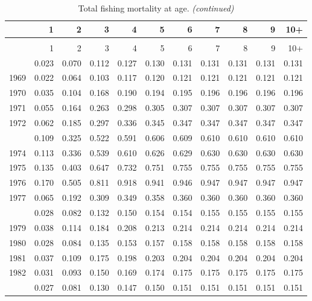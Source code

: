 \documentclass[
]{article}
\begin{document}
\begin{longtable}[t]{lrrrrrrrrrr}
\caption{\label{tab:FAA-tot-table}Total fishing mortality at age.}\\
\toprule
  & 1 & 2 & 3 & 4 & 5 & 6 & 7 & 8 & 9 & 10+\\
\midrule
\endfirsthead
\caption[]{Total fishing mortality at age. \textit{(continued)}}\\
\toprule
  & 1 & 2 & 3 & 4 & 5 & 6 & 7 & 8 & 9 & 10+\\
\midrule
\endhead

\endfoot
\bottomrule
\endlastfoot
1968 & 0.023 & 0.070 & 0.112 & 0.127 & 0.130 & 0.131 & 0.131 & 0.131 & 0.131 & 0.131\\
1969 & 0.022 & 0.064 & 0.103 & 0.117 & 0.120 & 0.121 & 0.121 & 0.121 & 0.121 & 0.121\\
1970 & 0.035 & 0.104 & 0.168 & 0.190 & 0.194 & 0.195 & 0.196 & 0.196 & 0.196 & 0.196\\
1971 & 0.055 & 0.164 & 0.263 & 0.298 & 0.305 & 0.307 & 0.307 & 0.307 & 0.307 & 0.307\\
1972 & 0.062 & 0.185 & 0.297 & 0.336 & 0.345 & 0.347 & 0.347 & 0.347 & 0.347 & 0.347\\
\addlinespace
1973 & 0.109 & 0.325 & 0.522 & 0.591 & 0.606 & 0.609 & 0.610 & 0.610 & 0.610 & 0.610\\
1974 & 0.113 & 0.336 & 0.539 & 0.610 & 0.626 & 0.629 & 0.630 & 0.630 & 0.630 & 0.630\\
1975 & 0.135 & 0.403 & 0.647 & 0.732 & 0.751 & 0.755 & 0.755 & 0.755 & 0.755 & 0.755\\
1976 & 0.170 & 0.505 & 0.811 & 0.918 & 0.941 & 0.946 & 0.947 & 0.947 & 0.947 & 0.947\\
1977 & 0.065 & 0.192 & 0.309 & 0.349 & 0.358 & 0.360 & 0.360 & 0.360 & 0.360 & 0.360\\
\addlinespace
1978 & 0.028 & 0.082 & 0.132 & 0.150 & 0.154 & 0.154 & 0.155 & 0.155 & 0.155 & 0.155\\
1979 & 0.038 & 0.114 & 0.184 & 0.208 & 0.213 & 0.214 & 0.214 & 0.214 & 0.214 & 0.214\\
1980 & 0.028 & 0.084 & 0.135 & 0.153 & 0.157 & 0.158 & 0.158 & 0.158 & 0.158 & 0.158\\
1981 & 0.037 & 0.109 & 0.175 & 0.198 & 0.203 & 0.204 & 0.204 & 0.204 & 0.204 & 0.204\\
1982 & 0.031 & 0.093 & 0.150 & 0.169 & 0.174 & 0.175 & 0.175 & 0.175 & 0.175 & 0.175\\
\addlinespace
1983 & 0.027 & 0.081 & 0.130 & 0.147 & 0.150 & 0.151 & 0.151 & 0.151 & 0.151 & 0.151\\

\end{longtable}
\end{document}
